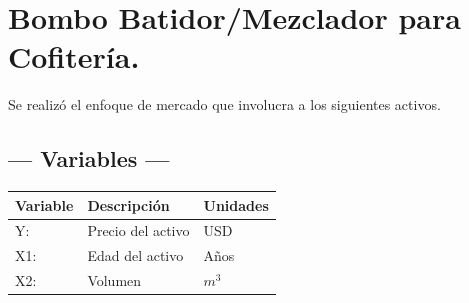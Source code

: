 
\section{Bombo Batidor/Mezclador para Cofitería.} %
Se realizó el enfoque de mercado que involucra a los siguientes activos.

\subsection{\centering --- Variables ---} %
\begin{center}
  \begin{tabular}{|l|l|l|}
    \hline 
    Variable & Descripción   & Unidades\\ \hline 
    Y:  & Precio del activo  & USD \\ \hline 
    X1: & Edad del activo    & Años \\ \hline 
		X2: & Volumen  & \(m ^ 3\) \\ \hline 
  \end{tabular}
\end{center} 

